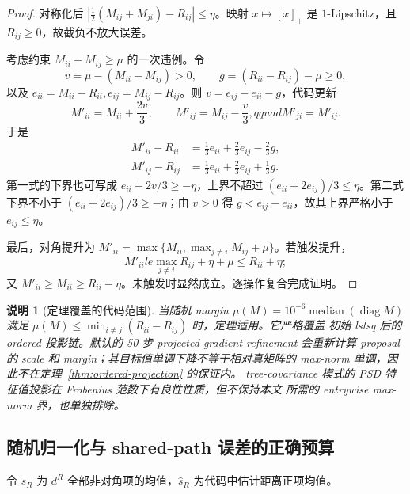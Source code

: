 \documentclass[UTF8,11pt]{ctexart}
\newtheorem{remark}[definition]{说明}
\newcommand{\diag}{\operatorname{diag}}
\begin{document}
\begin{proof}
对称化后
$|\frac12(M_{ij}+M_{ji})-R_{ij}|\le\eta$。映射 $x\mapsto[x]_+$ 是
$1$-Lipschitz，且 $R_{ij}\ge0$，故截负不放大误差。

考虑约束 $M_{ii}-M_{ij}\ge\mu$ 的一次违例。令
\begin{equation*}
 v=\mu-(M_{ii}-M_{ij})>0,
 \qquad
 g=(R_{ii}-R_{ij})-\mu\ge0,
\end{equation*}
以及 $e_{ii}=M_{ii}-R_{ii},e_{ij}=M_{ij}-R_{ij}$。则
$v=e_{ij}-e_{ii}-g$，代码更新
\begin{equation*}
 M'_{ii}=M_{ii}+\frac{2v}{3},\qquad
 M'_{ij}=M_{ij}-\frac v3,qquad M'_{ji}=M'_{ij}.
\end{equation*}
于是
\begin{align*}
 M'_{ii}-R_{ii}&=\frac13e_{ii}+\frac23e_{ij}-\frac23g,\\
 M'_{ij}-R_{ij}&=\frac13e_{ii}+\frac23e_{ij}+\frac13g.
\end{align*}
第一式的下界也可写成 $e_{ii}+2v/3\ge-\eta$，上界不超过
$(e_{ii}+2e_{ij})/3\le\eta$。第二式下界不小于
$(e_{ii}+2e_{ij})/3\ge-\eta$；由 $v>0$ 得
$g<e_{ij}-e_{ii}$，故其上界严格小于 $e_{ij}\le\eta$。

最后，对角提升为
$M'_{ii}=\max\{M_{ii},\max_{j\ne i}M_{ij}+\mu\}$。若触发提升，
\begin{equation*}
 M'_{ii}le\max_{j\ne i}R_{ij}+\eta+\mu\le R_{ii}+\eta;
\end{equation*}
又 $M'_{ii}\ge M_{ii}\ge R_{ii}-\eta$。未触发时显然成立。逐操作复合完成证明。
\end{proof}

\begin{remark}[定理覆盖的代码范围]
当随机 margin $\mu(M)=10^{-6}\operatorname{median}(\diag M)$ 满足
$\mu(M)\le\min_{i\ne j}(R_{ii}-R_{ij})$ 时，定理适用。它严格覆盖
初始 lstsq 后的 ordered 投影链。默认的 50 步 projected-gradient refinement
会重新计算 proposal 的 scale 和 margin；其目标值单调下降不等于相对真矩阵的
max-norm 单调，因此不在定理~\ref{thm:ordered-projection} 的保证内。
tree-covariance 模式的 PSD 特征值投影在 Frobenius 范数下有良性性质，但不保持本文
所需的 entrywise max-norm 界，也单独排除。
\end{remark}

\subsection{随机归一化与 shared-path 误差的正确预算}

令 $s_R$ 为 $d^R$ 全部非对角项的均值，$\widehat s_R$ 为代码中估计距离正项均值。
\end{document}
